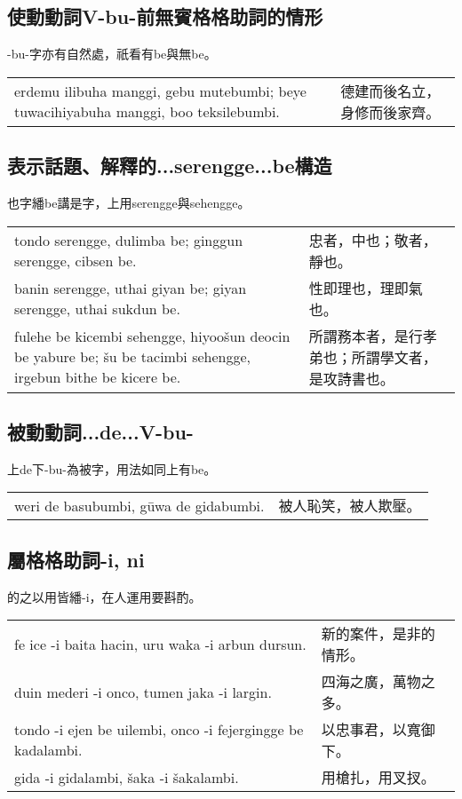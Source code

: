 \documentclass{article}
\begin{document}
\subsection{使動動詞V-bu-前無賓格格助詞的情形}
\noindent -bu-字亦有自然處，祇看有be與無be。
\begin{center}
    \begin{tabularx}{\textwidth}{XX}
     erdemu ilibuha manggi, gebu mutebumbi; beye tuwacihiyabuha manggi, boo teksilebumbi.&德建而後名立，身修而後家齊。
    \end{tabularx}
\end{center}

\subsection{表示話題、解釋的...serengge...be構造}
\noindent 也字繙be講是字，上用serengge與sehengge。
\begin{center}
    \begin{tabularx}{\textwidth}{XX}
     tondo serengge, dulimba be; ginggun serengge, cibsen be.&忠者，中也；敬者，靜也。\\
     banin serengge, uthai giyan be; giyan serengge, uthai sukdun be.&性即理也，理即氣也。\\
     fulehe be kicembi sehengge, hiyoo\v{s}un deocin be yabure be; \v{s}u be tacimbi sehengge, irgebun bithe be kicere be.&所謂務本者，是行孝弟也；所謂學文者，是攻詩書也。
    \end{tabularx}
\end{center}

\subsection{被動動詞...de...V-bu-}
\noindent 上de下-bu-為被字，用法如同上有be。
\begin{center}
    \begin{tabularx}{\textwidth}{XX}
     weri de basubumbi, g\={u}wa de gidabumbi.&被人恥笑，被人欺壓。
    \end{tabularx}
\end{center}

\subsection{屬格格助詞-i, ni}
\noindent 的之以用皆繙-i，在人運用要斟酌。
\begin{center}
    \begin{tabularx}{\textwidth}{XX}
     fe ice -i baita hacin, uru waka -i arbun dursun.&新的案件，是非的情形。\\
     duin mederi -i onco, tumen jaka -i largin.&四海之廣，萬物之多。\\
     tondo -i ejen be uilembi, onco -i fejergingge be kadalambi.&以忠事君，以寬御下。\\
     gida -i gidalambi, \v{s}aka -i \v{s}akalambi.&用槍扎，用叉扠。
    \end{tabularx}
\end{center}
\end{document}
